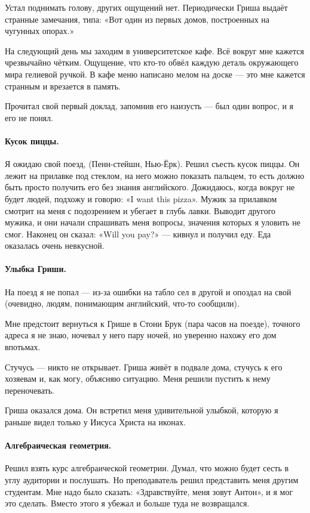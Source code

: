 \documentclass{book}
\begin{document}
Устал поднимать голову, других ощущений нет.
Периодически Гриша выдаёт странные замечания, типа: «Вот один из первых домов, построенных на чугунных опорах.»

На следующий день мы заходим в университетское кафе.
Всё вокруг мне кажется чрезвычайно чётким.
Ощущение, что кто-то обвёл каждую деталь окружающего мира гелиевой ручкой.
В кафе меню написано мелом на доске --- это мне кажется странным и врезается в память.

Прочитал свой первый доклад, запомнив его наизусть --- был один вопрос, и я его не понял.

\paragraph{Кусок пиццы.}
Я ожидаю свой поезд, (Пенн-стейшн, Нью-Ёрк).
Решил съесть кусок пиццы.
Он лежит на прилавке под стеклом, на него можно показать пальцем, то есть должно быть просто получить его без знания английского.
Дожидаюсь, когда вокруг не будет людей, подхожу и говорю: «I want this pizza».
Мужик за прилавком смотрит на меня с подозрением и убегает в глубь лавки.
Выводит другого мужика, и они начали спрашивать меня вопросы, значения которых я уловить не смог.
Наконец он сказал: «Will you pay?» --- кивнул и получил еду.
Еда оказалась очень невкусной.

\paragraph{Улыбка Гриши.}
На поезд я не попал --- из-за ошибки на табло сел в другой и опоздал на свой (очевидно, людям, понимающим английский, что-то сообщили).

Мне предстоит вернуться к Грише в Стони Брук (пара часов на поезде), точного адреса я не знаю, ночевал у него пару ночей, но уверенно нахожу его дом впотьмах.

Стучусь --- никто не открывает.
Гриша живёт в подвале дома, стучусь к его хозяевам и, как могу, объясняю ситуацию.
Меня решили пустить к нему переночевать.

Гриша оказался дома.
Он встретил меня удивительной улыбкой, которую я раньше видел только у Иисуса Христа на иконах.

\paragraph{Алгебраическая геометрия.}
Решил взять курс алгебраической геометрии.
Думал, что можно будет сесть в углу аудитории и послушать.
Но преподаватель решил представить меня другим студентам.
Мне надо было сказать: «Здравствуйте, меня зовут Антон», и я мог это сделать.
Вместо этого я убежал и больше туда не возвращался.
\end{document}
